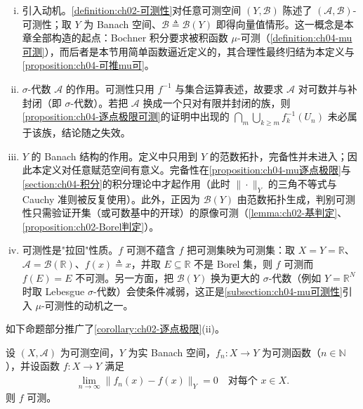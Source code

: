 \documentclass[../../main.tex]{subfiles}%
\begin{document}
\begin{remark}\label{remark:ch04-可测性动机}
\begin{enumerate}[(i)]
\item 引入动机。\cref{definition:ch02-可测性}对任意可测空间 $(Y,\mathcal{B})$ 陈述了 $(\mathcal{A},\mathcal{B})$-可测性；取 $Y$ 为 Banach 空间、$\mathcal{B}\triangleq\mathcal{B}(Y)$ 即得向量值情形。这一概念是本章全部构造的起点：Bochner 积分要求被积函数 $\mu$-可测（\cref{definition:ch04-mu可测}），而后者是本节用简单函数逼近定义的，其合理性最终归结为本定义与\cref{proposition:ch04-可推mu可}。
\item $\sigma$-代数 $\mathcal{A}$ 的作用。可测性只用 $f^{-1}$ 与集合运算表述，故要求 $\mathcal{A}$ 对可数并与补封闭（即 $\sigma$-代数）。若把 $\mathcal{A}$ 换成一个只对有限并封闭的族，则\cref{proposition:ch04-逐点极限可测}的证明中出现的 $\bigcap_{m}\bigcup_{k\geqslant m}f_k^{-1}(U_n)$ 未必属于该族，结论随之失效。
\item $Y$ 的 Banach 结构的作用。定义中只用到 $Y$ 的范数拓扑，完备性并未进入；因此本定义对任意赋范空间有意义。完备性在\cref{proposition:ch04-mu逐点极限}与\cref{section:ch04-积分}的积分理论中才起作用（此时 $\|\cdot\|_Y$ 的三角不等式与 Cauchy 准则被反复使用）。此外，正因为 $\mathcal{B}(Y)$ 由范数拓扑生成，判别可测性只需验证开集（或可数基中的开球）的原像可测（\cref{lemma:ch02-基判定}、\cref{proposition:ch02-Borel判定}）。
\item 可测性是"拉回"性质。$f$ 可测不蕴含 $f$ 把可测集映为可测集：取 $X=Y=\mathbb{R}$、$\mathcal{A}=\mathcal{B}(\mathbb{R})$、$f(x)\triangleq x$，并取 $E\subseteq\mathbb{R}$ 不是 Borel 集，则 $f$ 可测而 $f(E)=E$ 不可测。另一方面，把 $\mathcal{B}(Y)$ 换为更大的 $\sigma$-代数（例如 $Y=\mathbb{R}^N$ 时取 Lebesgue $\sigma$-代数）会使条件减弱，这正是\cref{subsection:ch04-mu可测性}引入 $\mu$-可测性的动机之一。
\end{enumerate}
\end{remark}

如下命题部分推广了\cref{corollary:ch02-逐点极限}(ii)。

\begin{proposition}[逐点极限的可测性]\label{proposition:ch04-逐点极限可测}\label{proposition:ch04-可测性}
设 $(X,\mathcal{A})$ 为可测空间，$Y$ 为实 Banach 空间，$f_n:X\to Y$ 为可测函数（$n\in\mathbb{N}$），并设函数 $f:X\to Y$ 满足
\begin{align}
\lim_{n\to\infty}\|f_n(x)-f(x)\|_Y=0\quad\text{对每个 }x\in X. \label{align:ch04-4.1}
\end{align}
则 $f$ 可测。
\end{proposition}
\end{document}
